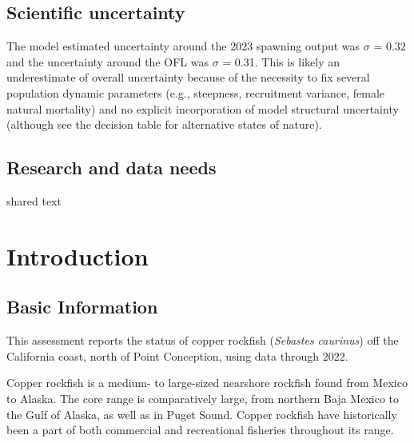 \documentclass[11pt,
  english,
  letterpaper,
]{article}
\begin{document}
\hypertarget{scientific-uncertainty}{%
\subsection*{Scientific uncertainty}\label{scientific-uncertainty}}

The model estimated uncertainty around the 2023 spawning output was \(\sigma\) = 0.32 and the uncertainty around the OFL was \(\sigma\) = 0.31. This is likely an underestimate of overall uncertainty because of the necessity to fix several population dynamic parameters (e.g., steepness, recruitment variance, female natural mortality) and no explicit incorporation of model structural uncertainty (although see the decision table for alternative states of nature).

\hypertarget{research-and-data-needs}{%
\subsection*{Research and data needs}\label{research-and-data-needs}}

shared text

\pagebreak
\setlength{\parskip}{5mm plus1mm minus1mm}
\setcounter{page}{1}
\renewcommand{\thefigure}{\arabic{figure}}
\renewcommand{\thetable}{\arabic{table}}
\setcounter{table}{0}
\setcounter{figure}{0}

\hypertarget{introduction}{%
\section{Introduction}\label{introduction}}

\hypertarget{basic-information}{%
\subsection{Basic Information}\label{basic-information}}

This assessment reports the status of copper rockfish (\emph{Sebastes caurinus}) off the California coast, north of Point Conception, using data through 2022.

Copper rockfish is a medium- to large-sized nearshore rockfish found from Mexico to Alaska. The core range is comparatively large, from northern Baja Mexico to the Gulf of Alaska, as well as in Puget Sound. Copper rockfish have historically been a part of both commercial and recreational fisheries throughout its range.
\end{document}
